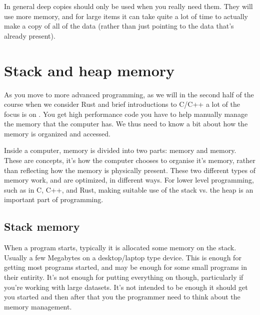 \documentclass[letterpaper,10pt,british]{sphinxmanual}
\begin{document}
\sphinxAtStartPar
In general deep copies should only be used when you really need them. They will use more memory, and for large items it can take quite a lot of time to actually make a copy of all of the data (rather than just pointing to the data that’s already present).

\sphinxstepscope


\section{Stack and heap memory}
\label{\detokenize{chapters/programming_fundamentals/stack_and_heap:stack-and-heap-memory}}\label{\detokenize{chapters/programming_fundamentals/stack_and_heap:stack-and-heap}}\label{\detokenize{chapters/programming_fundamentals/stack_and_heap::doc}}
\sphinxAtStartPar
As you move to more advanced programming, as we will in the second half of the course when we consider Rust and brief introductions to C/C++ a lot of the focus is on . You get high performance code you have to help manually manage the memory that the computer has. We thus need to know a bit about how the memory is organized and accessed.

\sphinxAtStartPar
Inside a computer, memory is divided into two parts:  memory and  memory. These are  concepts, it’s how the computer chooses to organise it’s memory, rather than reflecting how the memory is physically present. These two different types of memory work, and are optimized, in different ways. For lower level programming, such as in C, C++, and Rust, making suitable use of the stack vs. the heap is an important part of programming.


\subsection{Stack memory}
\label{\detokenize{chapters/programming_fundamentals/stack_and_heap:stack-memory}}
\sphinxAtStartPar
When a program starts, typically it is allocated some memory on the stack. Usually a few Megabytes on a desktop/laptop type device. This is enough for getting most programs started, and may be enough for some small programs in their entirity. It’s not enough for putting everything on though, particularly if you’re working with large datasets. It’s not intended to be enough \sphinxhyphen{} it should get you started and then after that you the programmer need to think about the memory management.
\end{document}
